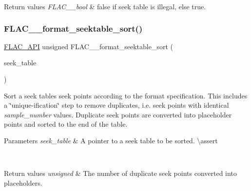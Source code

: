 \begin{DoxyRetVals}{Return values}
{\em F\+L\+A\+C\+\_\+\+\_\+bool} & {\ttfamily false} if seek table is illegal, else {\ttfamily true}. \\
\hline
\end{DoxyRetVals}
\mbox{\label{group__flac__format_gad1b0090d45a6d65a696a81261bd7fbf6}} 
\subsubsection{\texorpdfstring{FLAC\_\_format\_seektable\_sort()}{FLAC\_\_format\_seektable\_sort()}}
{\footnotesize\ttfamily \mbox{\hyperlink{group__flac__export_ga56ca07df8a23310707732b1c0007d6f5}{F\+L\+A\+C\+\_\+\+A\+PI}} unsigned F\+L\+A\+C\+\_\+\+\_\+format\+\_\+seektable\+\_\+sort (\begin{DoxyParamCaption}\item[{\mbox{\hyperlink{struct_f_l_a_c_____stream_metadata___seek_table}{F\+L\+A\+C\+\_\+\+\_\+\+Stream\+Metadata\+\_\+\+Seek\+Table}} $\ast$}]{seek\+\_\+table }\end{DoxyParamCaption})}

Sort a seek table\textquotesingle{}s seek points according to the format specification. This includes a \char`\"{}unique-\/ification\char`\"{} step to remove duplicates, i.\+e. seek points with identical {\itshape sample\+\_\+number} values. Duplicate seek points are converted into placeholder points and sorted to the end of the table.


\begin{DoxyParams}{Parameters}
{\em seek\+\_\+table} & A pointer to a seek table to be sorted. \textbackslash{}assert 
\begin{DoxyCode}{1}
\end{DoxyCode}
 \\
\hline
\end{DoxyParams}

\begin{DoxyRetVals}{Return values}
{\em unsigned} & The number of duplicate seek points converted into placeholders. \\
\hline
\end{DoxyRetVals}
\mbox{\label{group__flac__format_ga6878e238052fc0f7109b55129d64b4e5}} 
